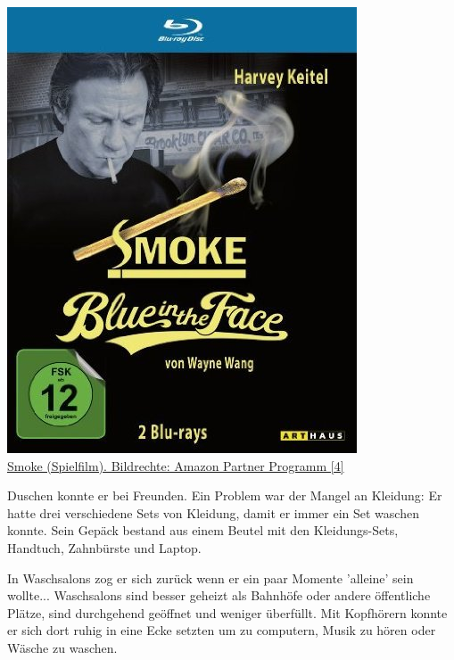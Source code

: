 \begin{center}
\href{http://goo.gl/9ENgMR}{\includegraphics[width=\linewidth]{nomad/nomad-smoke.jpg} \\
\footnotesize{Smoke (Spielfilm). Bildrechte: Amazon Partner Programm [4]}}
\end{center}


Duschen konnte er bei Freunden. Ein Problem war der Mangel an Kleidung: Er hatte drei verschiedene Sets von Kleidung, damit er immer ein Set waschen konnte. Sein Gepäck bestand aus einem Beutel mit den Kleidungs-Sets, Handtuch, Zahnbürste und Laptop.

In Waschsalons zog er sich zurück wenn er ein paar Momente 'alleine' sein wollte... Waschsalons sind besser geheizt als Bahnhöfe oder andere öffentliche Plätze, sind durchgehend geöffnet und weniger überfüllt. Mit Kopfhörern konnte er sich dort ruhig in eine Ecke setzten um zu computern, Musik zu hören oder Wäsche zu waschen.

